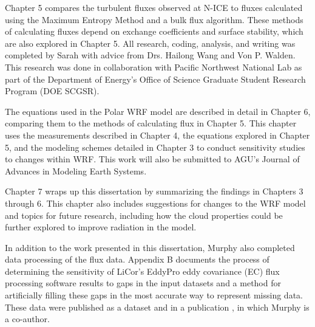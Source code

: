 Chapter 5 compares the turbulent fluxes observed at N-ICE to fluxes calculated using the Maximum Entropy Method and a bulk flux algorithm. These methods of calculating fluxes depend on exchange coefficients and surface stability, which are also explored in Chapter 5. All research, coding, analysis, and writing was completed by Sarah with advice from Drs. Hailong Wang and Von P. Walden. This research was done in collaboration with Pacific Northwest National Lab as part of the Department of Energy's Office of Science Graduate Student Research Program (DOE SCGSR). 

The equations used in the Polar WRF model are described in detail in Chapter 6, comparing them to the methods of calculating flux in Chapter 5. This chapter uses the measurements described in Chapter 4, the equations explored in Chapter 5, and the modeling schemes detailed in Chapter 3 to conduct sensitivity studies to changes within WRF. This work will also be submitted to AGU's Journal of Advances in Modeling Earth Systems.

Chapter 7 wraps up this dissertation by summarizing the findings in Chapters 3 through 6. This chapter also includes suggestions for changes to the WRF model and topics for future research, including how the cloud properties could be further explored to improve radiation in the model.

In addition to the work presented in this dissertation, Murphy also completed data processing of the flux data. Appendix B documents the process of determining the sensitivity of LiCor's EddyPro eddy covariance (EC) flux processing software results to gaps in the input datasets and a method for artificially filling these gaps in the most accurate way to represent missing data. These data were published as a dataset \citep{nicefluxes:2017} and in a publication \citep{walden:2017}, in which Murphy is a co-author.




